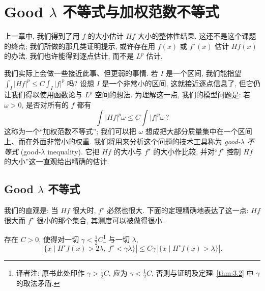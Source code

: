 \chapter{Good \texorpdfstring{$\lambda$}{lambda} 不等式与加权范数不等式}
\label{chap:3}

上一章中, 我们得到了用 $f$ 的大小估计 $Hf$ 大小的整体性结果. 这还不是这个课题的终点; 我们所做的那几类证明提示, 或许存在用 $f(x)$ 或 $f^{\star}(x)$ 估计 $Hf(x)$ 的办法. 我们也许能得到逐点估计, 而不是 $L^p$ 估计.

我们实际上会做一些接近此事、但更弱的事情. 若 $I$ 是一个区间, 我们能指望 $\int_I|Hf|^p\leq C\int_I|f|^p$ 吗? 设想 $I$ 是一个非常小的区间, 这就接近逐点信息了, 但它仍让我们得以使用函数论与 $L^p$ 空间的想法. 为理解这一点, 我们的模型问题是: 若 $\omega>0$, 是否对所有的 $f$ 都有
\[
\int|H f|^{p}\omega\leq C\int|f|^{p}\omega\,?
\]
这称为一个``加权范数不等式''; 我们可以把 $\omega$ 想成把大部分质量集中在一个区间上、而在外面非常小的权重. 我们将用来分析这个问题的技术工具称为 \emph{good-$\lambda$ 不等式} (good-$\lambda$ inequality). 它把 $Hf$ 的大小与 $f^{\star}$ 的大小作比较, 并对``$f^{\star}$ 控制 $Hf$ 的大小''这一直观给出精确的估计.

\section{Good \texorpdfstring{$\lambda$}{lambda} 不等式}
\label{sec:3.1}

我们的直观是: 当 $Hf$ 很大时, $f^{\star}$ 必然也很大. 下面的定理精确地表达了这一点: $Hf$ 很大而 $f^{\star}$ 很小的那个集合, 其测度可以被做得很小.

\begin{theorem}\label{thm:3.1}
存在 $C>0$, 使得对一切 $\gamma<\frac{1}{2}C$\footnote{译者注: 原书此处印作 $\gamma>\frac{1}{2}C$, 应为 $\gamma<\frac{1}{2}C$, 否则与证明及定理~\ref{thm:3.2} 中 $\gamma$ 的取法矛盾.} 与一切 $\lambda$,
\[
|\{x \mid H^{\star}f(x)>2\lambda,\ f^{\star}<\gamma\lambda\}|\leq C\gamma\,|\{x \mid H^{\star}f(x)>\lambda\}|.
\]
\end{theorem}

